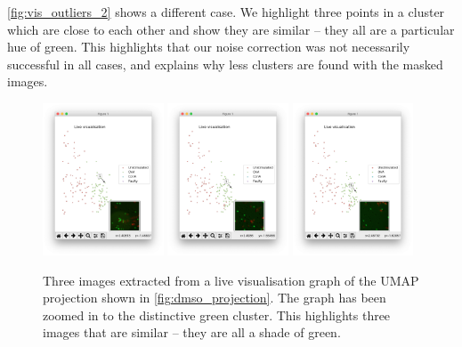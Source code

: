 \autoref{fig:vis_outliers_2} shows a different case. We highlight three points in a cluster which are close to each other and show they are similar – they all are a particular hue of green. This highlights that our noise correction was not necessarily successful in all cases, and explains why less clusters are found with the masked images. 

\begin{figure}[h]
    \centering
    \includegraphics[width=0.32\textwidth]{dissertation/figures/evaluation/green_cluster_1.png}
    \includegraphics[width=0.32\textwidth]{dissertation/figures/evaluation/green_cluster_2.png}
    \includegraphics[width=0.32\textwidth]{dissertation/figures/evaluation/green_cluster_3.png}
    \caption{Three images extracted from a live visualisation graph of the UMAP projection shown in \autoref{fig:dmso_projection}. The graph has been zoomed in to the distinctive green cluster. This highlights three images that are similar – they are all a shade of green.}
    \label{fig:vis_outliers_2}
\end{figure}


